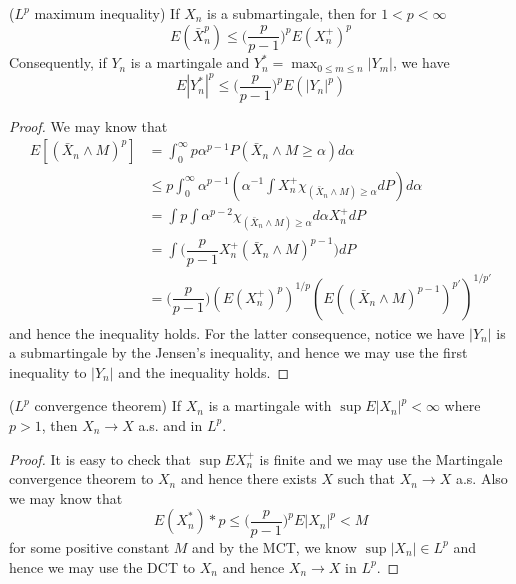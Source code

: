 \documentclass[lang=en, color=blue, ]{elegantbook}
\begin{document}
\begin{theorem}
    ($L^p$ maximum inequality) If $X_n$ is a submartingale, then for $1< p < \infty$
    \[E(\bar{X}_n^p) \leq \Big(\dfrac{p}{p-1}\Big)^p E(X_n^+)^p\]
    Consequently, if $Y_n$ is a martingale and $Y_n^* = \max_{0\leq m \leq n} |Y_m|$, we have
    \[E|Y_n^*|^p \leq \Big(\dfrac{p}{p-1}\Big)^p E(|Y_n|^p)\]
\end{theorem}
\begin{proof}
    We may know that
    \[
    \begin{aligned}
    E[(\bar{X}_n\wedge M)^p] &= \int_0^{\infty} p\alpha^{p-1}P(\bar{X}_n\wedge M \geq \alpha)d\alpha     \\
    &\leq p\int_0^{\infty} \alpha^{p-1}(\alpha^{-1}\int X_n^+\chi_{(\bar{X}_n\wedge M)\geq \alpha}dP)d\alpha \\
    & = \int p\int\alpha^{p-2}\chi_{(\bar{X}_n\wedge M) \geq \alpha} d\alpha X_n^+ dP \\
    & = \int\Big(\dfrac{p}{p-1}X_n^+(\bar{X}_n\wedge M)^{p-1}\Big)dP \\
    &= \Big(\dfrac{p}{p-1}\Big)(E(X_n^+)^p)^{1/p}(E((\bar{X}_n\wedge M)^{p-1})^{p'})^{1/p'}
    \end{aligned}
    \]
    and hence the inequality holds. For the latter consequence, notice we have $|Y_n|$ is a submartingale by the Jensen's inequality, and hence we may use the first inequality to $|Y_n|$ and the inequality holds.
\end{proof}

\begin{theorem}
    ($L^p$ convergence theorem) If $X_n$ is a martingale with $\sup E|X_n|^p < \infty$ where $p > 1$, then $X_n \to X$ a.s. and in $L^p$.
\end{theorem}
\begin{proof}
    It is easy to check that $\sup EX_n^+$ is finite and we may use the Martingale convergence theorem to $X_n$ and hence there exists $X$ such  that $X_n \to X$ a.s. Also we may know that
    \[E(X_n^*)*p \leq \Big(\dfrac{p}{p-1}\Big)^p E|X_n|^p < M\]
    for some positive constant $M$ and by the MCT, we know $\sup |X_n| \in L^p$ and hence we may use the DCT to $X_n$ and hence $X_n \to X$ in $L^p$.
\end{proof}
\end{document}
